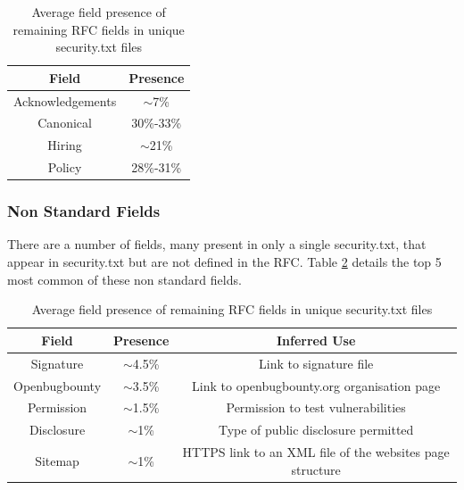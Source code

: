 \documentclass{mscreport}
\begin{document}
\begin{table}[H]
  \begin{center}
    \begin{tabular}{|c|c|}  %
      \hline
      \textbf{Field} & \textbf{Presence}\\
      \hline
      Acknowledgements & $\sim$7\%\\
      \hline
      Canonical & 30\%-33\%\\
      \hline
      Hiring & $\sim$21\%\\
      \hline
      Policy & 28\%-31\%\\
      \hline
    \end{tabular}
    \caption{Average field presence of remaining RFC fields in unique security.txt files}
    \label{table:security_txt_by_other_rfc_fields} %
  \end{center}
\end{table}

\subsubsection{Non Standard Fields}

There are a number of fields, many present in only a single security.txt, that appear in security.txt but are not defined in the RFC. Table \ref{table:security_txt_by_non_rfc_fields} details the top 5 most common of these non standard fields.

\begin{table}[H]
  \begin{center}
    \begin{tabular}{|c|c|c|}  %
      \hline
      \textbf{Field} & \textbf{Presence} & \textbf{Inferred Use}\\
      \hline
      Signature & $\sim$4.5\% & Link to signature file\\
      \hline
      Openbugbounty & $\sim$3.5\% & Link to openbugbounty.org organisation page\\
      \hline
      Permission & $\sim$1.5\% & Permission to test vulnerabilities\\
      \hline
      Disclosure & $\sim$1\% & Type of public disclosure permitted\\
      \hline
      Sitemap & $\sim$1\% & HTTPS link to an XML file of the websites page structure\\
      \hline
    \end{tabular}
    \caption{Average field presence of remaining RFC fields in unique security.txt files}
    \label{table:security_txt_by_non_rfc_fields} %
  \end{center}
\end{table}
\end{document}
